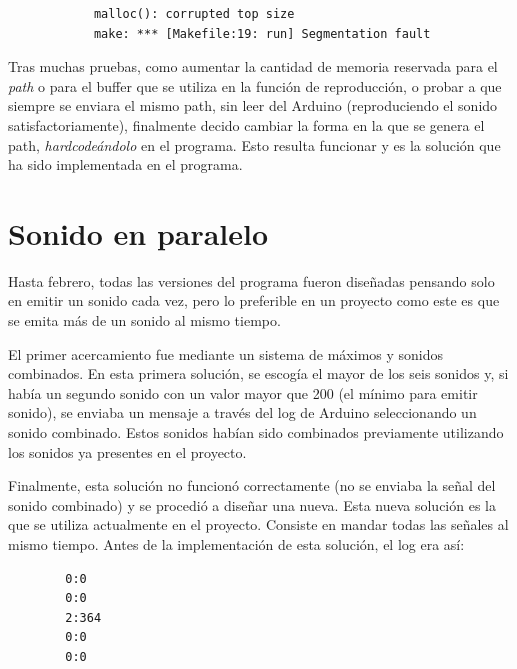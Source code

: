 \begin{itemize}
            \begin{verbatim}
            malloc(): corrupted top size
            make: *** [Makefile:19: run] Segmentation fault
            \end{verbatim}

            Tras muchas pruebas, como aumentar la cantidad de memoria reservada para el \textit{path} o para el
            buffer que se utiliza en la función de reproducción, o probar a que siempre se enviara el mismo path,
            sin leer del Arduino (reproduciendo el sonido satisfactoriamente), finalmente decido cambiar la forma en
            la que se genera el path, \textit{hardcodeándolo} en el programa. Esto resulta funcionar y es la solución
            que ha sido implementada en el programa.
        \end{itemize}


    \section{Sonido en paralelo} %
    \label{sec:SonidoEnParalelo}

        Hasta febrero, todas las versiones del programa fueron diseñadas pensando solo en emitir un sonido cada vez,
        pero lo preferible en un proyecto como este es que se emita más de un sonido al mismo tiempo.\newline

        El primer acercamiento fue mediante un sistema de máximos y sonidos combinados. En esta primera solución, se
        escogía el mayor de los seis sonidos y, si había un segundo sonido con un valor mayor que 200 (el mínimo para
        emitir sonido), se enviaba un mensaje a través del log de Arduino seleccionando un sonido combinado. Estos
        sonidos habían sido combinados previamente utilizando los sonidos ya presentes en el proyecto.\newline

        Finalmente, esta solución no funcionó correctamente (no se enviaba la señal del sonido combinado) y se procedió
        a diseñar una nueva. Esta nueva solución es la que se utiliza actualmente en el proyecto. Consiste en mandar
        todas las señales al mismo tiempo. Antes de la implementación de esta solución, el log era así:

        \begin{verbatim}
        0:0
        0:0
        2:364
        0:0
        0:0
        \end{verbatim}

